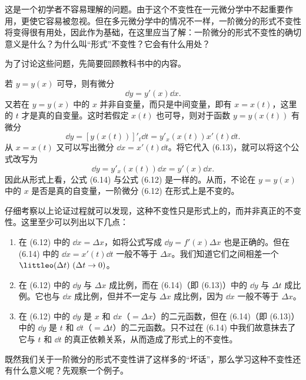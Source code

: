 这是一个初学者不容易理解的问题。由于这个不变性在一元微分学中不起重要作用，更使它容易被忽视。但在多元微分学中的情况不一样，一阶微分的形式不变性将变得很有用处，因此作为基础，在这里应当了解：一阶微分的形式不变性的确切意义是什么？为什么叫“形式”不变性？它会有什么用处？

为了讨论这些问题，先简要回顾教科书中的内容。

若 $y=y(x)$ 可导，则有微分
\begin{equation}
  \dd y=y'(x)\dd x.
  \tag{6.12}
  \label{eq:6.12}
\end{equation}
又若在 $y=y(x)$ 中的 $x$ 并非自变量，而只是中间变量，即有 $x=x(t)$，这里的 $t$ 才是真的自变量。这时若假定 $x(t)$ 也可导，则对于函数 $y=y(x(t))$ 有微分
\begin{equation}
  \dd y=[y(x(t))]'_t\dd t=y'_x(x(t))x'(t)\dd t.
  \tag{6.13}
  \label{eq:6.13}
\end{equation}
从 $x=x(t)$ 又可以写出微分 $\dd x=x'(t)\dd t$。将它代入 (6.13)，就可以将这个公式改写为
\begin{equation}
  \dd y=y'_x(x(t))\dd x=y'(x)\dd x.
  \tag{6.14}
  \label{eq:6.14}
\end{equation}
因此从形式上看，公式 (6.14) 与公式 (6.12) 是一样的。从而，不论在 $y=y(x)$ 中的 $x$ 是否是真的自变量，一阶微分 (6.12) 在形式上是不变的。

仔细考察以上论证过程就可以发现，这种不变性只是形式上的，而并非真正的不变性。这里至少可以列出以下几点：
\begin{enumerate}
  \item 在 (6.12) 中的 $\dd x=\Delta x$，如将公式写成 $\dd y=f'(x)\Delta x$ 也是正确的。但在 (6.14) 中的 $\dd x=x'(t)\dd t$ 一般不等于 $\Delta x$。我们知道它们之间相差一个 $\littleo(\Delta t)\ (\Delta t\to0)$。
  \item 在 (6.12) 中的 $\dd y$ 与 $\Delta x$ 成比例，而在 (6.14)（即 (6.13)）中的 $\dd y$ 与 $\Delta t$ 成比例。它也与 $\dd x$ 成比例，但并不一定与 $\Delta x$ 成比例，因为 $\dd x$ 一般不等于 $\Delta x$。
  \item 在 (6.12) 中的 $\dd y$ 是 $x$ 和 $\dd x$（$=\Delta x$）的二元函数，但在 (6.14)（即 (6.13)）中的 $\dd y$ 是 $t$ 和 $\dd t$（$=\Delta t$）的二元函数。只不过在 (6.14) 中我们故意抹去了它与 $t$ 和 $\dd t$ 的真正依赖关系，从而造成了形式上的不变性。
\end{enumerate}

既然我们关于一阶微分的形式不变性讲了这样多的“坏话”，那么学习这种不变性还有什么意义呢？先观察一个例子。

